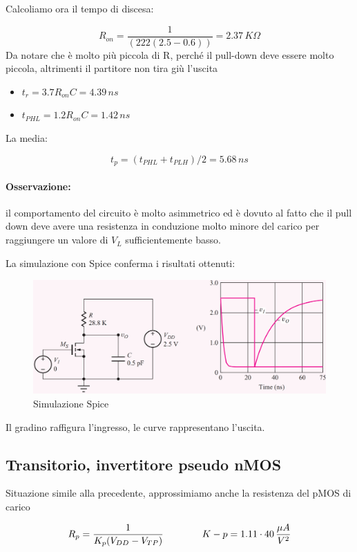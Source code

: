 Calcoliamo ora il tempo di discesa:


\begin{equation*}
    R_{on} = \frac{1}{(222(2.5-0.6))} = 2.37\,K \Omega
\end{equation*}
Da notare che è molto più piccola di R, perché il pull-down deve essere molto piccola, altrimenti il partitore non tira giù l'uscita
\begin{itemize}
    \item[] $t_r = 3.7R_{on}C = 4.39\, ns$
    \item[] $t_{PHL} = 1.2R_{on}C = 1.42\, ns$
\end{itemize}


La media: 

\begin{equation*}
    t_p = (t_{PHL} + t_{PLH})/2 = 5.68\,ns
\end{equation*}

\paragraph{Osservazione: } il comportamento del circuito è molto asimmetrico ed è dovuto	al	fatto	che	il	pull	down	deve	avere	una	resistenza	in	
conduzione	molto	minore	del	carico	per	raggiungere	un	valore	
di	$V_L$ sufficientemente	basso.



La	simulazione	con	Spice	conferma	i	risultati	ottenuti:

\begin{figure}[htbp]
    \centering
    \includegraphics[width=0.5\linewidth]{img/spice.png}
    \caption{Simulazione Spice}    
\end{figure}
Il gradino raffigura l'ingresso, le curve rappresentano l'uscita.


\newpage
\subsection{Transitorio, invertitore pseudo nMOS}

Situazione	simile	alla	precedente,	approssimiamo	anche	 la	resistenza	del	pMOS di	carico

\begin{equation*}
    R_p = \frac{1}{K_p(V_{DD} - V_{TP})}\qquad\qquad K-p = 1.11\cdot40\,\frac{\mu A}{V^2}
\end{equation*}

